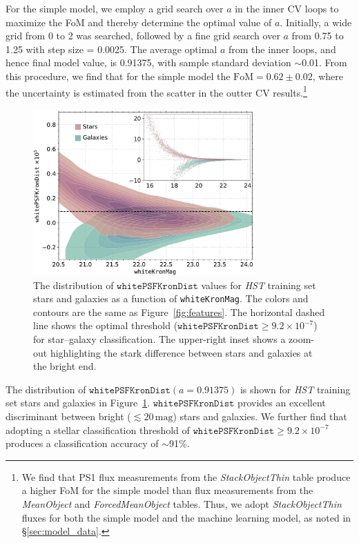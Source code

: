 \documentclass[twocolumn]{aastex62}
\begin{document}
For the simple model, we employ a grid search over $a$ in the inner CV loops
to maximize the FoM and thereby determine the optimal value of $a$.
Initially, a wide grid from 0 to 2 was searched, followed by a fine grid
search over $a$ from 0.75 to 1.25 with step size = 0.0025. The average
optimal $a$ from the inner loops, and hence final model value, is 0.91375,
with sample standard deviation $\sim$0.01. From this procedure, we find that
for the simple model the $\mathrm{FoM} = 0.62 \pm 0.02$, where the
uncertainty is estimated from the scatter in the outter CV
results.\footnote{We find that PS1 flux measurements from the
\textit{StackObjectThin} table produce a higher FoM for the simple model
than flux measurements from the \textit{MeanObject} and
\textit{ForcedMeanObject} tables. Thus, we adopt \textit{StackObjectThin}
fluxes for both the simple model and the machine learning model, as noted in
\S\ref{sec:model_data}.}


\begin{figure}[t]
 \centering
  \includegraphics[width=3.35in]{./Figures/whitePSFKronDist.pdf}
  \caption{ The distribution of $\mathtt{whitePSFKronDist}$ values for
  \textit{HST} training set stars and galaxies as a function of
  \texttt{whiteKronMag}. The colors and contours are the same as
  Figure~\ref{fig:features}. The horizontal dashed line shows the optimal
  threshold ($\mathtt{whitePSFKronDist} \ge 9.2 \times 10^{-7}$) for
  star--galaxy classification. The upper-right inset shows a zoom-out
  highlighting the stark difference between stars and galaxies at the bright
  end. }
  \label{fig:psfkrondist}
\end{figure}

The distribution of $\mathtt{whitePSFKronDist}(a=0.91375)$ is shown for
\textit{HST} training set stars and galaxies in
Figure~\ref{fig:psfkrondist}. $\mathtt{whitePSFKronDist}$ provides an
excellent discriminant between bright ($\lesssim 20\,\mathrm{mag}$) stars
and galaxies. We further find that adopting a stellar classification
threshold of $\mathtt{whitePSFKronDist} \ge 9.2 \times 10^{-7}$ produces a
classification accuracy of $\sim$91\%.
\end{document}
